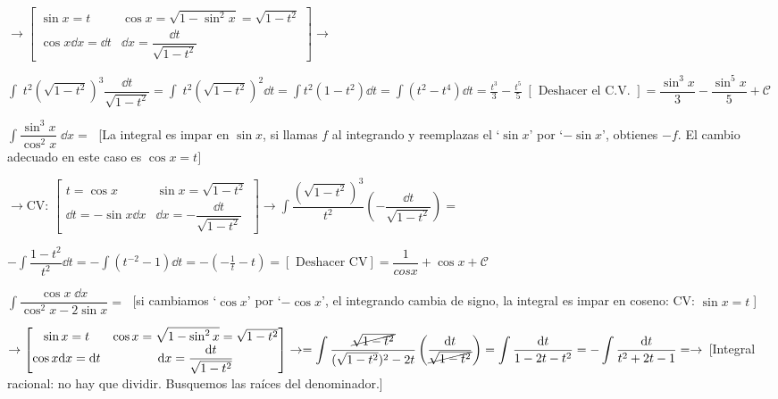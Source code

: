 {\begin{ejem}
$\to \left[ \begin{matrix} \sin x = t & \cos x =\sqrt{1-\sin^2 x}= \sqrt{1-t^2}\\ \cos x \dd x = \dd  t & \dd x = \dfrac {\dd t}{\sqrt{1-t^2}} \end{matrix} \right] \to    $	

$\displaystyle \int \;t^2 (\sqrt{1-t^2})^3 \dfrac {\dd t}{\sqrt{1-t^2}} = \int \;t^2 (\sqrt{1-t^2})^2  \dd t = \int t^2(1-t^2) \dd t= \int (t^2-t^4)\dd t= \frac {t^3}{3} - \frac {t^5}{5} \; [ \text { Deshacer el C.V. }] = \dfrac {\sin^3 x}{3}-\dfrac {\sin^5 x}{5}+\mathcal C$
\end{ejem}

\begin{ejem}
	$\displaystyle \int \dfrac {\sin^3 x}{\cos^2 x} \; \dd x = \; $ [La integral es impar en $\sin x$, si llamas $f$ al integrando y reemplazas el `$\sin x$' por `$-\sin x$', obtienes $-f$. El cambio adecuado en este caso es $\cos x = t ] $
	
	$\to \text{CV: } \left[ \begin{matrix} t=\cos x & \sin x=\sqrt{1-t^2} \\ \dd t = -\sin x \dd x & \dd x = - \dfrac {\dd t}{\sqrt{1-t^2}} \end{matrix} \right] \to \displaystyle \int \dfrac {(\sqrt{1-t^2})^3}{t^2} \left(- \dfrac {\dd t}{\sqrt{1-t^2}} \right)   =    $
	
	$\displaystyle - \int \dfrac {1-t^2}{t^2} \dd t = - \int (t^{-2} - 1) \dd t = -(-\frac 1 t - t)= [\text{ Deshacer CV}] = \dfrac {1}{cos x} + \cos x + \mathcal C$	
	
\end{ejem}

\begin{ejem}
$\displaystyle \int \dfrac {\cos x \; \dd x} {\cos^2 x - 2\sin x}=\; $ [si cambiamos  `$\cos x$' por `$-\cos x$', el integrando cambia de signo, la integral es impar en coseno: CV: $\sin x=t \; $]

$\to \left[ \begin{matrix} \sin x = t & \cos x =\sqrt{1-\sin^2 x}= \sqrt{1-t^2}\\ \cos x \dd x = \dd  t & \dd x = \dfrac {\dd t}{\sqrt{1-t^2}} \end{matrix} \right] \to  =\displaystyle \int \dfrac {\cancel{\sqrt{1-t^2}}}{(\sqrt{1-t^2})^2-2t} \left( \dfrac {\dd t}{\cancel{\sqrt{1-t^2}}} \right)  = \int \dfrac {\dd t}{1-2t-t^2}=- \int \dfrac {\dd t}{t^2+2t-1}= \to  $ [Integral racional: no hay que dividir. Busquemos las raíces del denominador.]


\end{ejem}}
